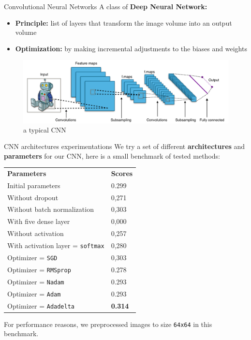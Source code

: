 \begin{frame}[c]{Convolutional Neural Networks}
    A class of \textbf{Deep Neural Network:}
    \begin{itemize}
        \item \textbf{Principle:} list of layers that transform the image volume into an output volume
        \item \textbf{Optimization:} by making incremental adjustments to the biases and weights
    \end{itemize}
    \begin{figure}
        \includegraphics[width=\linewidth]{Typical_cnn.png}
        \caption{a typical CNN}
    \end{figure}
\end{frame}

\begin{frame}[c]{CNN architectures experimentations}
    We try a set of different \textbf{architectures} and \textbf{parameters} for our CNN, here is a small benchmark of tested methods:
    \begin{table}[]
    \begin{tabular}{ll}
    \textbf{Parameters}                 & \textbf{Scores} \\
    Initial parameters & 0.299  \\
    Without dropout & 0,271  \\
    Without batch normalization & 0,303  \\
    With five dense layer & 0,000  \\
    Without activation & 0,257  \\
    With activation layer = \texttt{softmax} & 0,280  \\
    Optimizer = \texttt{SGD} & 0,303  \\
    Optimizer = \texttt{RMSprop} & 0.278  \\
    Optimizer = \texttt{Nadam} & 0.293  \\
    Optimizer = \texttt{Adam} & 0.293  \\
    Optimizer = \texttt{Adadelta} & \textbf{0.314}
    \end{tabular}
    \end{table}
    For performance reasons, we preprocessed images to size \texttt{64x64} in this benchmark.
\end{frame}

